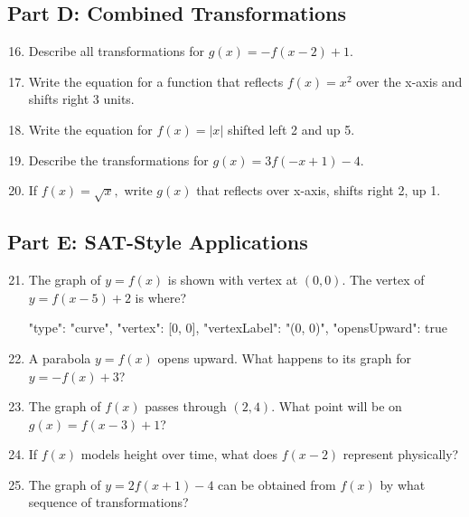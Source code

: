 \documentclass[14pt]{extarticle}
\begin{document}
\subsection*{Part D: Combined Transformations}
\begin{enumerate}
  \setcounter{enumi}{15}
  \item Describe all transformations for \(g(x) = -f(x - 2) + 1.\)
  \item Write the equation for a function that reflects \(f(x) = x^2\) over the x-axis and shifts right 3 units.
  \item Write the equation for \(f(x) = |x|\) shifted left 2 and up 5.
  \item Describe the transformations for \(g(x) = 3f(-x + 1) - 4.\)
  \item If \(f(x) = \sqrt{x},\) write \(g(x)\) that reflects over x-axis, shifts right 2, up 1.
\end{enumerate}

\subsection*{Part E: SAT-Style Applications}
\begin{enumerate}
  \setcounter{enumi}{20}
  \item The graph of \(y = f(x)\) is shown with vertex at \((0,0)\).
  The vertex of \(y = f(x - 5) + 2\) is where?
  \begin{diagramdata}
  {
    "type": "curve",
    "vertex": [0, 0],
    "vertexLabel": "(0, 0)",
    "opensUpward": true
  }
  \end{diagramdata}
  \item A parabola \(y = f(x)\) opens upward.  
  What happens to its graph for \(y = -f(x) + 3\)?
  \item The graph of \(f(x)\) passes through \((2, 4)\).  
  What point will be on \(g(x) = f(x - 3) + 1\)?
  \item If \(f(x)\) models height over time, what does \(f(x - 2)\) represent physically?
  \item The graph of \(y = 2f(x + 1) - 4\) can be obtained from \(f(x)\) by what sequence of transformations?
\end{enumerate}

\newpage

\end{document}
